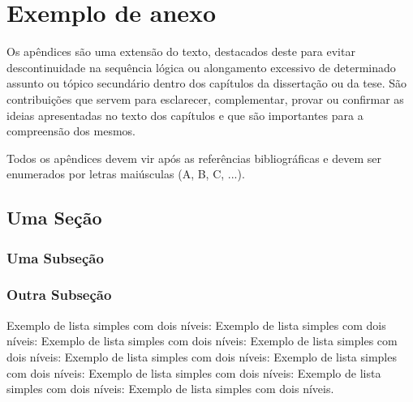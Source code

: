 \chapter{Exemplo de anexo}


Os apêndices são uma extensão do texto, destacados deste para evitar descontinuidade na sequência lógica ou alongamento excessivo de determinado assunto ou tópico secundário dentro dos capítulos da dissertação ou da tese. São contribuições que servem para esclarecer, complementar, provar ou confirmar as ideias apresentadas no texto dos capítulos e que são importantes para a compreensão dos mesmos.

Todos os apêndices devem vir após as referências bibliográficas e devem ser enumerados por letras maiúsculas (A, B, C, ...).


\section{Uma Seção}

\lipsum[20-23]


\subsection{Uma Subseção}

\lipsum[30-33]


\subsection{Outra Subseção}

Exemplo de lista simples com dois níveis: Exemplo de lista simples com dois níveis: Exemplo de lista simples com dois níveis: Exemplo de lista simples com dois níveis: Exemplo de lista simples com dois níveis: Exemplo de lista simples com dois níveis: Exemplo de lista simples com dois níveis: Exemplo de lista simples com dois níveis: Exemplo de lista simples com dois níveis.

